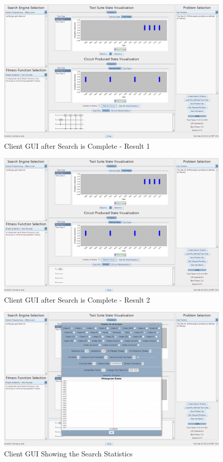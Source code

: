 \begin{figure}
  \includegraphics[width=\textwidth]{walkthrough9b.png}
 \caption{Client GUI after Search is Complete - Result 1}
 \label{fig:walkthrough9b}
\end{figure}

\begin{figure}
  \includegraphics[width=\textwidth]{walkthrough9c.png}
 \caption{Client GUI after Search is Complete - Result 2}
 \label{fig:walkthrough9c}
\end{figure}

\begin{figure}
  \includegraphics[width=\textwidth]{walkthrough10.png}
 \caption{Client GUI Showing the Search Statistics}
 \label{fig:walkthrough10}
\end{figure}

